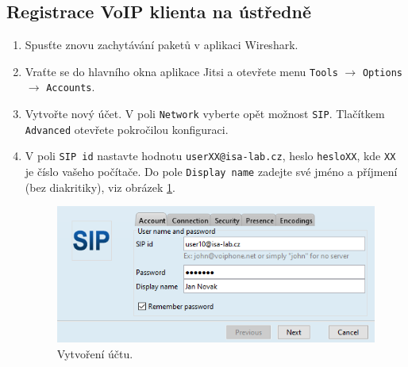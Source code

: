 \documentclass[a4paper,11pt]{article}
\begin{document}
\subsection{Registrace VoIP klienta na ústředně}
\begin{enumerate}
    \item Spusťte znovu zachytávání paketů v aplikaci Wireshark.
    \item Vraťte se do hlavního okna aplikace Jitsi a otevřete menu {\tt Tools} $\rightarrow$ {\tt Options} $\rightarrow$ {\tt Accounts}.
    \item Vytvořte nový účet. V poli {\tt Network} vyberte opět možnost {\tt SIP}. Tlačítkem {\tt Advanced} otevřete pokročilou konfiguraci.
    \item V poli {\tt SIP id} nastavte hodnotu {\tt userXX@isa-lab.cz}, heslo {\tt hesloXX}, kde {\tt XX} je číslo vašeho počítače. Do pole {\tt Display name} zadejte své jméno a příjmení (bez diakritiky), viz obrázek \ref{fig:registration1}.
      \begin{figure}[h!]
        \centering
        \includegraphics[scale=0.7]{img/jitsi-registration1c.png}
        \caption{Vytvoření účtu.}
        \label{fig:registration1}
      \end{figure}
      

\end{enumerate}
\end{document}
